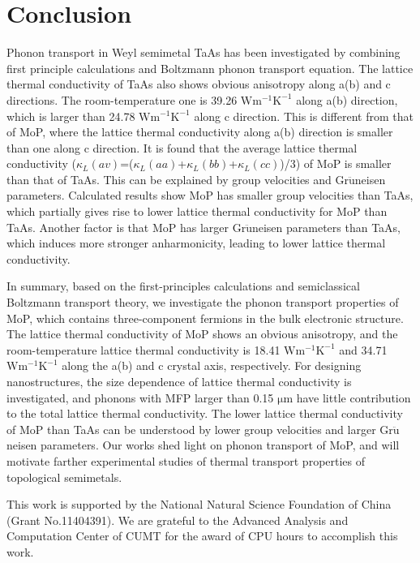 \documentclass[twocolumn,showkeys,aps,prb,showpacs]{revtex4-1}
\begin{document}
\section{Conclusion}
Phonon transport  in Weyl semimetal TaAs has been investigated by combining first principle calculations
and Boltzmann phonon transport equation\cite{q12,q13}.  The lattice thermal conductivity of TaAs also shows  obvious anisotropy along a(b) and c directions.
The room-temperature one is 39.26  $\mathrm{W m^{-1} K^{-1}}$ along a(b) direction, which is larger than 24.78 $\mathrm{W m^{-1} K^{-1}}$ along c direction\cite{q12}. This is different from that of MoP, where the lattice thermal conductivity along a(b) direction is smaller than one along c direction.
It is found that the average  lattice thermal conductivity ($\kappa_L(av)$=($\kappa_L(aa)$+$\kappa_L(bb)$+$\kappa_L(cc)$)/3) of MoP is smaller than that of TaAs.  This can be explained by group velocities and  Gr$\mathrm{\ddot{u}}$neisen parameters.   Calculated results show MoP has smaller group velocities than TaAs\cite{q13},  which partially gives rise to lower lattice thermal conductivity for MoP than TaAs. Another factor is that MoP has larger Gr$\mathrm{\ddot{u}}$neisen parameters than TaAs\cite{q13}, which induces more stronger anharmonicity, leading to lower  lattice thermal conductivity.






In summary, based on the first-principles calculations and semiclassical Boltzmann transport theory, we investigate the phonon transport properties of MoP,  which contains three-component fermions in the bulk electronic structure.
The  lattice thermal conductivity of MoP shows an obvious anisotropy, and
the room-temperature lattice thermal conductivity  is  18.41  $\mathrm{W m^{-1} K^{-1}}$  and 34.71 $\mathrm{W m^{-1} K^{-1}}$
 along the a(b) and c crystal axis, respectively. For designing nanostructures,
 the size dependence of lattice thermal conductivity  is investigated, and  phonons with MFP larger than 0.15 $\mathrm{\mu m}$  have little contribution to the total lattice thermal conductivity.
The lower  lattice thermal conductivity of MoP than TaAs
 can be understood by lower group velocities and larger Gr$\mathrm{\ddot{u}}$neisen parameters.   Our works shed light on phonon transport of MoP, and will motivate farther experimental studies of thermal transport properties of  topological semimetals.

\begin{acknowledgments}
This work is supported by the National Natural Science Foundation of China (Grant No.11404391). We are grateful to the Advanced Analysis and Computation Center of CUMT for the award of CPU hours to accomplish this work.
\end{acknowledgments}
\end{document}
